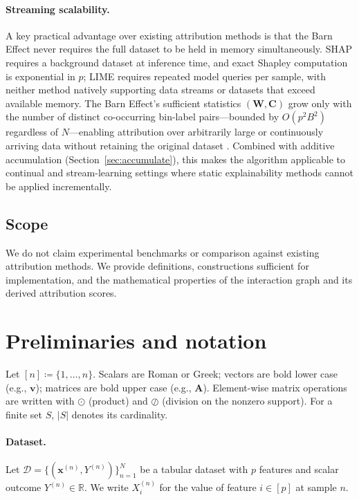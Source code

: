 \documentclass[11pt]{article}
\begin{document}
\paragraph{Streaming scalability.}
A key practical advantage over existing attribution methods is that the Barn Effect never requires the full dataset to be held in memory simultaneously.
SHAP \cite{Lundberg2017} requires a background dataset at inference time, and exact Shapley computation is exponential in $p$; LIME \cite{Ribeiro2016} requires repeated model queries per sample, with neither method natively supporting data streams or datasets that exceed available memory.
The Barn Effect's sufficient statistics $(\bm{W}, \bm{C})$ grow only with the number of distinct co-occurring bin-label pairs---bounded by $O(p^2 B^2)$ regardless of $N$---enabling attribution over arbitrarily large or continuously arriving data without retaining the original dataset \cite{Gama2014,Bifet2018}.
Combined with additive accumulation (Section~\ref{sec:accumulate}), this makes the algorithm applicable to continual and stream-learning settings \cite{Gama2014} where static explainability methods cannot be applied incrementally.

\subsection*{Scope}
We do not claim experimental benchmarks or comparison against existing attribution methods.
We provide definitions, constructions sufficient for implementation, and the mathematical properties of the interaction graph and its derived attribution scores.

\section{Preliminaries and notation}
\label{sec:prelim}

Let $[n] \coloneqq \{1,\ldots,n\}$.
Scalars are Roman or Greek; vectors are bold lower case (e.g., $\bm{v}$); matrices are bold upper case (e.g., $\bm{A}$).
Element-wise matrix operations are written with $\odot$ (product) and $\oslash$ (division on the nonzero support).
For a finite set $S$, $|S|$ denotes its cardinality.

\paragraph{Dataset.}
Let $\mathcal{D} = \{(\bm{x}^{(n)}, Y^{(n)})\}_{n=1}^{N}$ be a tabular dataset with $p$ features and scalar outcome $Y^{(n)} \in \mathbb{R}$.
We write $X_i^{(n)}$ for the value of feature $i \in [p]$ at sample $n$.
\end{document}
